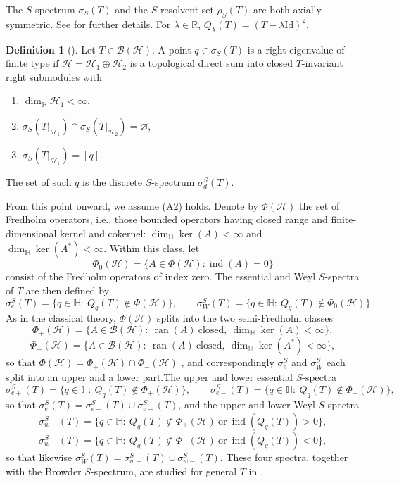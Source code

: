 \documentclass[12pt,a4paper]{article}
\theoremstyle{plain}
\theoremstyle{definition}
\newtheorem{definition}[theorem]{Definition}
\theoremstyle{remark}
\newcommand{\HH}{\mathbb H}
\newcommand{\RR}{\mathbb R}
\newcommand{\BB}{\mathcal B}
\newcommand{\Id}{\mathrm{Id}}
\newcommand{\HS}{\mathcal H}
\newcommand{\dimH}{\dim_{\HH}}
\newcommand{\sigS}{\sigma_S}
\newcommand{\sigeS}{\sigma_{e}^{S}}
\newcommand{\sigwS}{\sigma_{W}^{S}}
\newcommand{\sigdS}{\sigma_{d}^{S}}
\newcommand{\sigeuS}{\sigma_{e+}^{S}}
\newcommand{\sigedS}{\sigma_{e-}^{S}}
\newcommand{\sigwuS}{\sigma_{w+}^{S}}
\newcommand{\sigwdS}{\sigma_{w-}^{S}}
\DeclareMathOperator{\ran}{ran}
\DeclareMathOperator{\ind}{ind}
\begin{document}
{\noindent The $S$-spectrum $\sigma_{S}(T)$ and the $S$-resolvent set $\rho_{S}(T)$ are both axially symmetric. See \cite{ColomboGantnerKimsey2018} for further details. For $\lambda\in\RR$,
$Q_\lambda(T)=(T-\lambda\Id)^2$.
\begin{definition}[{\cite[Definition 3.7]{BaloudiBelgacemJeribi2022}}]
\label{def:finite-type}
Let $T\in\BB(\HS)$. A point $q\in\sigS(T)$ is a right eigenvalue
of finite type if $\HS=\HS_1\oplus\HS_2$ is a topological direct sum
into closed $T$-invariant right submodules with
\begin{enumerate}[label=(\textup{F}\arabic*),leftmargin=3em]
\item $\dimH\HS_1<\infty$,
\item $\sigS(T|_{\HS_1})\cap\sigS(T|_{\HS_2})=\varnothing$,
\item $\sigS(T|_{\HS_1})=[q]$.
\end{enumerate}
The set of such $q$ is the discrete $S$-spectrum $\sigdS(T)$.
\end{definition}
From this point onward, we assume (A2) holds. Denote by \(\Phi(\HS)\) the set of
Fredholm operators, i.e., those bounded operators having closed range and
finite-dimensional kernel and cokernel: \(\dimH\ker(A)<\infty\) and
\(\dimH\ker(A^*)<\infty\). Within this class, let
$$\Phi_0(\HS)=\{A\in\Phi(\HS):\ind(A)=0\}$$ consist of the Fredholm operators of
index zero. The essential and Weyl \(S\)-spectra of \(T\) are then
defined by
\[
 \sigeS(T)=\{q\in\HH:\ Q_q(T)\notin\Phi(\HS)\},
 \qquad
 \sigwS(T)=\{q\in\HH:\ Q_q(T)\notin\Phi_0(\HS)\}.
\]
As in the classical theory, $\Phi(\HS)$ splits into the two
semi-Fredholm classes
$$\Phi_+(\HS)=\{A\in\BB(\HS):\ \ran(A)\ \text{closed},\
 \dimH\ker(A)<\infty\},$$
$$ \Phi_-(\HS)=\{A\in\BB(\HS):\ \ran(A)\ \text{closed},\
 \dimH\ker(A^*)<\infty\},$$
so that $\Phi(\HS)=\Phi_+(\HS)\cap\Phi_-(\HS)$
\cite{MuraleetharanThirulogasanthar2018}, and correspondingly $\sigeS$
and $\sigwS$ each split into an upper and a lower part.The
upper and lower essential $S$-spectra
\[
 \sigeuS(T)=\{q\in\HH:\ Q_q(T)\notin\Phi_+(\HS)\},
 \qquad
 \sigedS(T)=\{q\in\HH:\ Q_q(T)\notin\Phi_-(\HS)\},
\]
so that $\sigeS(T)=\sigeuS(T)\cup\sigedS(T)$, and the upper and lower Weyl $S$-spectra
$$\sigwuS(T)=\{q\in\HH:\ Q_q(T)\notin\Phi_+(\HS)\ \text{or}\
 \ind(Q_q(T))>0\},$$
 $$\sigwdS(T)=\{q\in\HH:\ Q_q(T)\notin\Phi_-(\HS)\ \text{or}\
 \ind(Q_q(T))<0\},$$
so that likewise $\sigwS(T)=\sigwuS(T)\cup\sigwdS(T)$. These four
spectra, together with the Browder $S$-spectrum, are studied for
general $T$ in
\cite{MuraleetharanThirulogasanthar2018,MuraleetharanThirulogasanthar2019},
}
\end{document}
